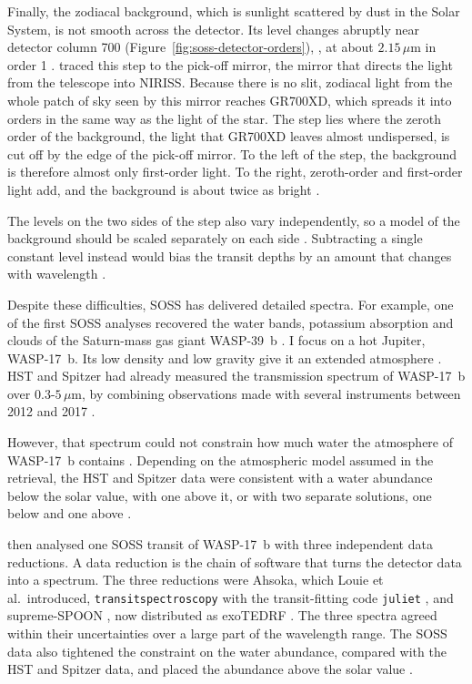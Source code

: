 Finally, the zodiacal background, which is sunlight scattered by dust in the
Solar System, is not smooth across the detector. Its level changes abruptly
near detector column 700 (Figure~\ref{fig:soss-detector-orders}), \citep{AlbertEtAl2023,LouieEtAl2025}, at about $2.15\,\mu\mathrm{m}$ in order 1 \citep{AlbertEtAl2023}.
\citet{AlbertEtAl2023} traced this step to the pick-off mirror, the mirror
that directs the light from the telescope into NIRISS. Because there is no
slit, zodiacal light from the whole patch of sky seen by this mirror reaches
GR700XD, which spreads it into orders in the same way as the light of the
star. The step lies where the zeroth order of the background, the light that
GR700XD leaves almost undispersed, is cut off by the edge of the pick-off
mirror. To the left of the step, the background is therefore almost only
first-order light. To the right, zeroth-order and first-order light add, and
the background is about twice as bright \citep{AlbertEtAl2023}.

The levels on the two sides of the step also vary independently, so a model
of the background should be scaled separately on each side
\citep{AlbertEtAl2023,LouieEtAl2025}. Subtracting a single constant level
instead would bias the transit depths by an amount that changes with
wavelength \citep{RadicaEtAl2023}. 

Despite these difficulties, SOSS has delivered detailed spectra. For example,
one of the first SOSS analyses recovered the water bands, potassium absorption
and clouds of the Saturn-mass gas giant WASP-39~b \citep{FeinsteinEtAl2023}. I focus on a hot Jupiter, WASP-17~b. Its low density and low gravity give it an
extended atmosphere \citep{AndersonEtAl2010}. HST and Spitzer had already
measured the transmission spectrum of WASP-17~b over $0.3$-$5\,\mu\mathrm{m}$,
by combining observations made with several instruments between 2012 and 2017
\citep{AldersonEtAl2022}.

However, that spectrum could not constrain how much water the atmosphere of
WASP-17~b contains \citep{LouieEtAl2025}. Depending on the atmospheric model assumed in the retrieval, the HST and Spitzer data
were consistent with a water abundance below the solar value, with one above
it, or with two separate solutions, one below and one above
\citep{AldersonEtAl2022,LouieEtAl2025}.

\citet{LouieEtAl2025} then analysed one SOSS transit of WASP-17~b with three
independent data reductions. A data reduction is the chain of software that
turns the detector data into a spectrum. The three reductions were Ahsoka,
which Louie et al.\ introduced, \texttt{transitspectroscopy}
\citep{Espinoza2022TransitSpectroscopy} with the transit-fitting code
\texttt{juliet} \citep{EspinozaEtAl2019}, and supreme-SPOON
\citep{RadicaEtAl2023}, now distributed as exoTEDRF \citep{Radica2024}. The
three spectra agreed within their uncertainties over a large part of the
wavelength range. The SOSS data also tightened the constraint on the water
abundance, compared with the HST and Spitzer data, and placed the abundance
above the solar value \citep{LouieEtAl2025}.

